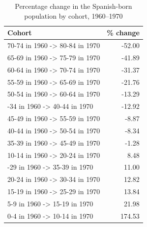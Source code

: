 \begin{table}

\caption{Percentage change in the Spanish-born population by cohort, 1960--1970}
\centering
\begin{tabular}[t]{lr}
\toprule
Cohort & \% change\\
\midrule
70-74 in 1960 -> 80-84 in 1970 & -52.00\\
65-69 in 1960 -> 75-79 in 1970 & -41.89\\
60-64 in 1960 -> 70-74 in 1970 & -31.37\\
55-59 in 1960 -> 65-69 in 1970 & -21.76\\
50-54 in 1960 -> 60-64 in 1970 & -13.29\\
\addlinespace
30-34 in 1960 -> 40-44 in 1970 & -12.92\\
45-49 in 1960 -> 55-59 in 1970 & -8.87\\
40-44 in 1960 -> 50-54 in 1970 & -8.34\\
35-39 in 1960 -> 45-49 in 1970 & -1.28\\
10-14 in 1960 -> 20-24 in 1970 & 8.48\\
\addlinespace
25-29 in 1960 -> 35-39 in 1970 & 11.00\\
20-24 in 1960 -> 30-34 in 1970 & 12.82\\
15-19 in 1960 -> 25-29 in 1970 & 13.84\\
5-9 in 1960 -> 15-19 in 1970 & 21.98\\
0-4 in 1960 -> 10-14 in 1970 & 174.53\\
\bottomrule
\end{tabular}
\end{table}
